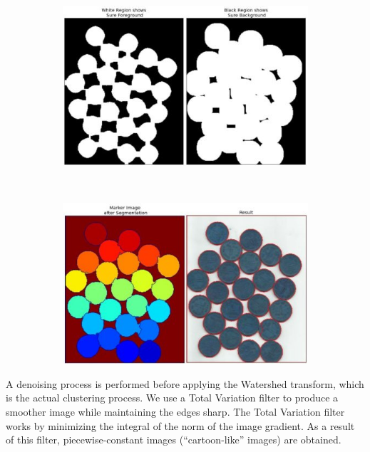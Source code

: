 \begin{figure}[htbp]
	\centering
    \begin{subfigure}[l]{0.49\textwidth}
	    \centering
    	\includegraphics[width=\textwidth]
    	{figures/Watershed-02.jpg}
	\end{subfigure}
	~
    \begin{subfigure}[r]{0.49\textwidth}
	    \centering
    	\includegraphics[width=\textwidth]
    	{figures/Watershed-03.jpg}
	\end{subfigure} 
    \caption{}
    \label{fig:watershed_example}
\end{figure}


A denoising process is performed before applying the Watershed transform, which is the actual clustering process. We use a Total Variation filter  to produce a smoother image while maintaining the edges sharp. The Total Variation filter works by minimizing the integral of the norm of the image gradient. As a result of this filter, piecewise-constant images (``cartoon-like'' images) are obtained.

